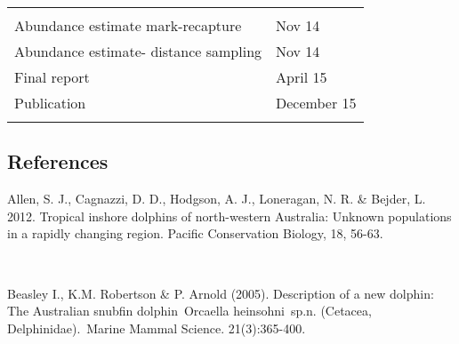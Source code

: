 \documentclass[version=last,
    paper=a4,                               %
    10pt,                                   %
    dvipsnames,
    oneside,                              %
    headings=openany,                       %
    open=any,
    BCOR=7mm,                               %
    DIV=15,     %
]{scrbook}
\begin{document}
\begin{longtable}[c]{@{}ll@{}}
\begin{minipage}[t]{0.47\columnwidth}
\end{minipage}
\\\addlinespace
\begin{minipage}[t]{0.47\columnwidth}\raggedright
Abundance estimate mark-recapture
\end{minipage} & \begin{minipage}[t]{0.47\columnwidth}\raggedright
Nov 14
\end{minipage}
\\\addlinespace
\begin{minipage}[t]{0.47\columnwidth}\raggedright
Abundance estimate- distance sampling
\end{minipage} & \begin{minipage}[t]{0.47\columnwidth}\raggedright
Nov 14
\end{minipage}
\\\addlinespace
\begin{minipage}[t]{0.47\columnwidth}\raggedright
Final report
\end{minipage} & \begin{minipage}[t]{0.47\columnwidth}\raggedright
April 15
\end{minipage}
\\\addlinespace
\begin{minipage}[t]{0.47\columnwidth}\raggedright
Publication
\end{minipage} & \begin{minipage}[t]{0.47\columnwidth}\raggedright
December 15
\end{minipage}
\\\addlinespace
\bottomrule
\end{longtable}




\subsection*{References}

Allen, S. J., Cagnazzi, D. D., Hodgson, A. J., Loneragan, N. R. \&
Bejder, L. 2012. Tropical inshore dolphins of north-western Australia:
Unknown populations in a rapidly changing region. Pacific Conservation
Biology, 18, 56-63.

~

Beasley I., K.M. Robertson \& P. Arnold (2005). Description of a new
dolphin: The Australian snubfin dolphin~Orcaella heinsohni~sp.n.
(Cetacea, Delphinidae).~Marine Mammal Science. 21(3):365-400.

~
\end{document}
